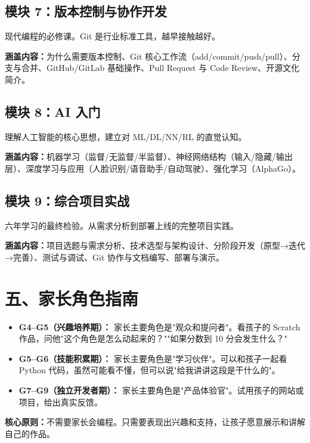 \documentclass[a4paper,12pt]{ctexart}
\begin{document}
\subsection*{模块 7：版本控制与协作开发}

现代编程的必修课。Git 是行业标准工具，越早接触越好。

\textbf{涵盖内容：}为什么需要版本控制、Git 核心工作流（add/commit/push/pull）、分支与合并、GitHub/GitLab 基础操作、Pull Request 与 Code Review、开源文化简介。

\subsection*{模块 8：AI 入门}

理解人工智能的核心思想，建立对 ML/DL/NN/RL 的直觉认知。

\textbf{涵盖内容：}机器学习（监督/无监督/半监督）、神经网络结构（输入/隐藏/输出层）、深度学习与应用（人脸识别/语音助手/自动驾驶）、强化学习（AlphaGo）。

\subsection*{模块 9：综合项目实战}

六年学习的最终检验。从需求分析到部署上线的完整项目实践。

\textbf{涵盖内容：}项目选题与需求分析、技术选型与架构设计、分阶段开发（原型→迭代→完善）、测试与调试、Git 协作与文档编写、部署与演示。

\section*{五、家长角色指南}

\begin{itemize}
  \item \textbf{G4--G5（兴趣培养期）：} 家长主要角色是"观众和提问者"。看孩子的 Scratch 作品，问他"这个角色是怎么动起来的？""如果分数到 10 分会发生什么？"
  \item \textbf{G5--G6（技能积累期）：} 家长主要角色是"学习伙伴"。可以和孩子一起看 Python 代码，虽然可能看不懂，但可以说"给我讲讲这段是干什么的"。
  \item \textbf{G7--G9（独立开发者期）：} 家长主要角色是"产品体验官"。试用孩子的网站或项目，给出真实反馈。
\end{itemize}

\textbf{核心原则：}不需要家长会编程。只需要表现出兴趣和支持，让孩子愿意展示和讲解自己的作品。
\end{document}
